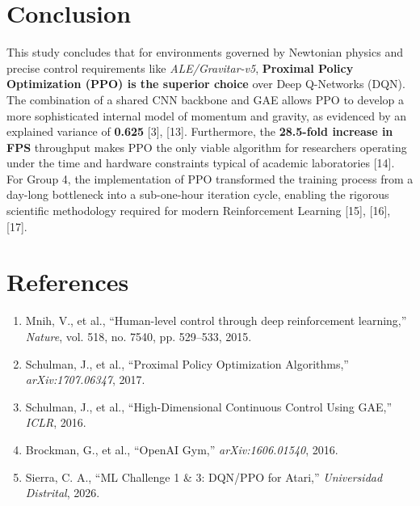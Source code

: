 \documentclass[conference]{IEEEtran}
\begin{document}
\section{Conclusion}
This study concludes that for environments governed by Newtonian physics and precise control requirements like \textit{ALE/Gravitar-v5}, \textbf{Proximal Policy Optimization (PPO) is the superior choice} over Deep Q-Networks (DQN).
The combination of a shared CNN backbone and GAE allows PPO to develop a more sophisticated internal model of momentum and gravity, as evidenced by an explained variance of \textbf{0.625} [3], [13].
Furthermore, the \textbf{28.5-fold increase in FPS} throughput makes PPO the only viable algorithm for researchers operating under the time and hardware constraints typical of academic laboratories [14].
For Group 4, the implementation of PPO transformed the training process from a day-long bottleneck into a sub-one-hour iteration cycle, enabling the rigorous scientific methodology required for modern Reinforcement Learning [15], [16], [17].

\section*{References}
\begin{enumerate}
    \item Mnih, V., et al., ``Human-level control through deep reinforcement learning,'' \textit{Nature}, vol. 518, no.
7540, pp. 529--533, 2015.
    \item Schulman, J., et al., ``Proximal Policy Optimization Algorithms,'' \textit{arXiv:1707.06347}, 2017.
    \item Schulman, J., et al., ``High-Dimensional Continuous Control Using GAE,'' \textit{ICLR}, 2016.
    \item Brockman, G., et al., ``OpenAI Gym,'' \textit{arXiv:1606.01540}, 2016.
    \item Sierra, C. A., ``ML Challenge 1 \& 3: DQN/PPO for Atari,'' \textit{Universidad Distrital}, 2026.
\end{enumerate}
\end{document}
